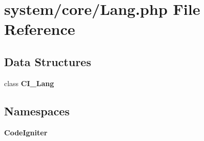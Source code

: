 \section{system/core/\-Lang.php File Reference}
\label{_lang_8php}
\subsection*{Data Structures}
\begin{DoxyCompactItemize}
\item 
class {\bf C\-I\-\_\-\-Lang}
\end{DoxyCompactItemize}
\subsection*{Namespaces}
\begin{DoxyCompactItemize}
\item 
{\bf Code\-Igniter}
\end{DoxyCompactItemize}

